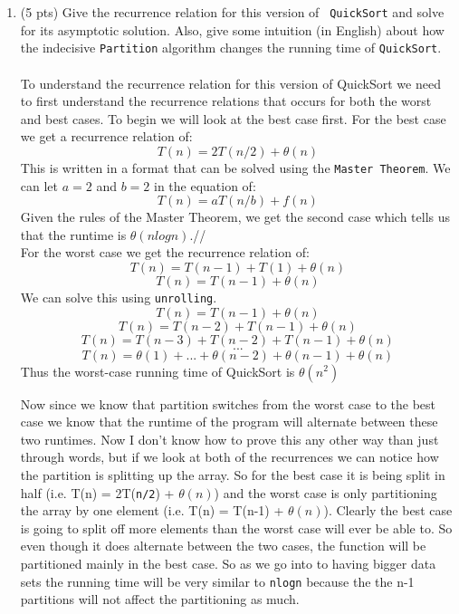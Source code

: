 \documentclass[12pt]{article}
\begin{document}
\begin{enumerate}
\begin{enumerate}
    \pagebreak	
    \item (5 pts) Give the recurrence relation for this version of {\tt
    QuickSort} and solve for its asymptotic solution. Also, give some intuition
    (in English) about how the indecisive {\tt Partition} algorithm changes the
    running time of {\tt QuickSort}.\\
    \\
    To understand the recurrence relation for this version of QuickSort we need to first understand the recurrence relations that occurs for both the worst and best cases. To begin we will look at the best case first. For the best case we get a recurrence relation of: 
    $$T(n) = 2T(n/2) + \theta(n)$$
    This is written in a format that can be solved using the {\tt Master Theorem}. We can let $a = 2$ and $b = 2$ in the equation of:
    $$T(n) = aT(n/b) + f(n)$$ 
    Given the rules of the Master Theorem, we get the second case which tells us that the runtime is $\theta(nlogn)$.//
    \\
    For the worst case we get the recurrence relation of:
    $$T(n) = T(n-1) + T(1) + \theta(n)$$
    $$T(n) = T(n-1) + \theta(n)$$
    We can solve this using {\tt unrolling}.
    $$T(n) = T(n-1) + \theta(n)$$
    $$T(n) = T(n-2) + T(n-1) + \theta(n)$$
    $$T(n) = T(n-3) + T(n-2) + T(n-1) + \theta(n)$$
    $$...$$
    $$T(n) = \theta(1) + ... + \theta(n-2) + \theta(n-1) + \theta(n)$$
    Thus the worst-case running time of QuickSort is $\theta({n}^2)$
    \\
    \par Now since we know that partition switches from the worst case to the best case we know that the runtime of the program will alternate between these two runtimes. Now I don't know how to prove this any other way than just through words, but if we look at both of the recurrences we can notice how the partition is splitting up the array. So for the best case it is being split in half (i.e. T(n) = 2T({\tt n/2}) + $\theta(n)$) and the worst case is only partitioning the array by one element (i.e. T(n) = T(n-1) + $\theta(n)$). Clearly the best case is going to split off more elements than the worst case will ever be able to. So even though it does alternate between the two cases, the function will be partitioned mainly in the best case. So as we go into to having bigger data sets the running time will be very similar to {\tt nlogn} because the the n-1 partitions will not affect the partitioning as much. 
    \pagebreak	
\end{enumerate}
	


\end{enumerate}
\end{document}
